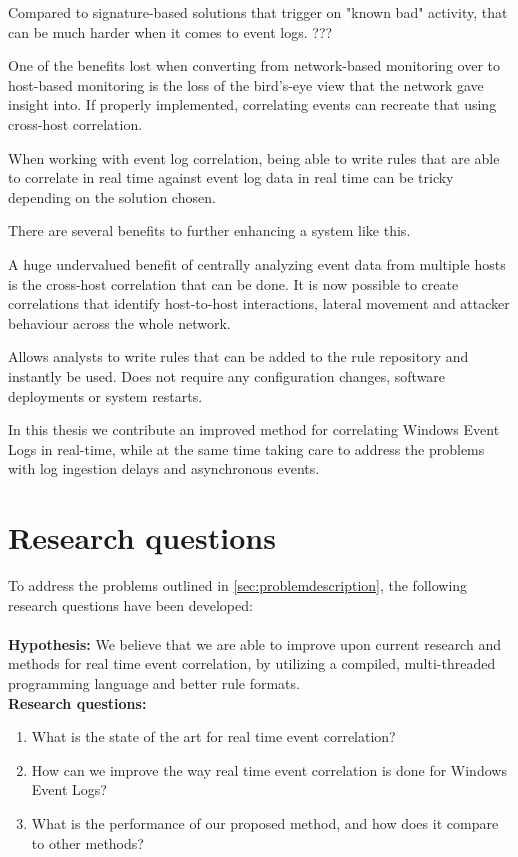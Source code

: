 Compared to signature-based solutions that trigger on "known bad" activity, that can be much harder when it comes to event logs.
???

One of the benefits lost when converting from network-based monitoring over to host-based monitoring is the loss of the bird's-eye view that the network gave insight into. If properly implemented, correlating events can recreate that using cross-host correlation.

When working with event log correlation, being able to write rules that are able to correlate in real time against event log data in real time can be tricky depending on the solution chosen.

There are several benefits to further enhancing a system like this.

A huge undervalued benefit of centrally analyzing event data from multiple hosts is the cross-host correlation that can be done. It is now possible to create correlations that identify host-to-host interactions, lateral movement and attacker behaviour across the whole network.

Allows analysts to write rules that can be added to the rule repository and instantly be used. Does not require any configuration changes, software deployments or system restarts.

In this thesis we contribute an improved method for correlating Windows Event Logs in real-time, while at the same time taking care to address the problems with log ingestion delays and asynchronous events.

\section{Research questions}
\label{sec:researchquestions}
To address the problems outlined in \ref{sec:problemdescription}, the following research questions have been developed:\\\\
\textbf{Hypothesis:} We believe that we are able to improve upon current research and methods for real time event correlation, by utilizing a compiled, multi-threaded programming language and better rule formats.\\
\textbf{Research questions:}
\begin{enumerate}
    \item What is the state of the art for real time event correlation?
    \item How can we improve the way real time event correlation is done for Windows Event Logs? %
    \item What is the performance of our proposed method, and how does it compare to other methods?
\end{enumerate}

